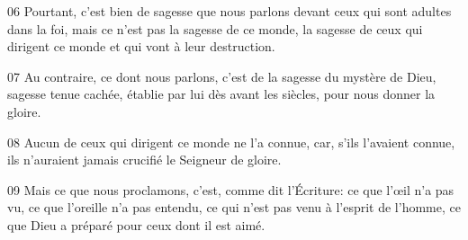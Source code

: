 
06 Pourtant, c’est bien de sagesse que nous parlons devant ceux qui sont adultes dans la foi, mais ce n’est pas la sagesse de ce monde, la sagesse de ceux qui dirigent ce monde et qui vont à leur destruction.

07 Au contraire, ce dont nous parlons, c’est de la sagesse du mystère de Dieu, sagesse tenue cachée, établie par lui dès avant les siècles, pour nous donner la gloire.

08 Aucun de ceux qui dirigent ce monde ne l’a connue, car, s’ils l’avaient connue, ils n’auraient jamais crucifié le Seigneur de gloire.

09 Mais ce que nous proclamons, c’est, comme dit l’Écriture: ce que l’œil n’a pas vu, ce que l’oreille n’a pas entendu, ce qui n’est pas venu à l’esprit de l’homme, ce que Dieu a préparé pour ceux dont il est aimé.
